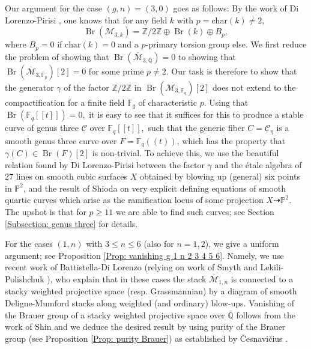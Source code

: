 \documentclass{amsart}
\theoremstyle{definition}
\theoremstyle{remark}
\DeclareMathOperator{\Br}{Br}
\newcommand{\Q}{\mathbb{Q}}
\newcommand{\ZZ}{\mathbb Z}
\begin{document}
Our argument for the case $(g, n)=(3, 0)$ goes as follows:
By the work of Di Lorenzo-Pirisi \cite{Lorenzo-Pirisi}, one knows that for any field $k$ with $p=\text{char}(k)\neq 2,$
$$
\Br(\mathcal{M}_{3, k})=\ZZ/2\ZZ \oplus \Br(k) \oplus B_{p},
$$
where $B_{p}=0$ if $\text{char}(k)=0$ and a $p$-primary torsion group else.
We first reduce the problem of showing that $\Br(\overline{\mathcal{M}}_{3, \overline{\Q}})=0$ to showing that $\Br(\overline{\mathcal{M}}_{3, \overline{\mathbb{F}}_{p}})[2]=0$ for some prime $p\neq 2.$
Our task is therefore to show that the generator $\gamma$ of the factor $\ZZ/2\ZZ$ in $\Br(\mathcal{M}_{3,\mathbb{F}_{q}})[2]$ does not extend to the compactification for a finite field $\mathbb{F}_{q}$ of characteristic $p$.
Using that $\Br(\mathbb{F}_{q}[[t]])=0,$ it is easy to see that it suffices for this to produce a stable curve of genus three $\mathscr{C}$ over $\mathbb{F}_{q}[[t]],$ such that the generic fiber $C=\mathscr{C}_{\eta}$ is a smooth genus three curve over $F=\mathbb{F}_{q}((t))$, which has the property that $\gamma(C) \in \Br(F)[2]$ is non-trivial.
To achieve this, we use the beautiful relation found by Di Lorenzo-Pirisi between the factor $\gamma$ and the étale algebra of 27 lines on smooth cubic surfaces $X$ obtained by blowing up (general) six points in $\mathbb{P}^{2}$, and the result of Shioda \cite{Shioda} on very explicit defining equations of smooth quartic curves which arise as the ramification locus of some projection $X \dashrightarrow \mathbb{P}^{2}$.
The upshot is that for $p\geq 11$ we are able to find such curves; see Section \ref{Subsection: genus three} for details.



For the cases $(1,n)$ with $3\leq n \leq 6$
(also for $n=1, 2$), we give a uniform argument; see Proposition \ref{Prop: vanishing g 1 n 2 3 4 5 6}.
Namely, we use recent work of Battistella-Di Lorenzo \cite{battistella2024wallcrossingintegralchowrings} (relying on work of Smyth \cite{Smyth19DiagramG1} and Lekili-Polishchuk \cite{LP19ModularCompactification}), who explain that in these cases the stack $\overline{\mathcal{M}}_{1,n}$ is connected to a stacky weighted projective space (resp. Grassmannian) by a diagram of smooth Deligne-Mumford stacks along weighted (and ordinary) blow-ups. 
Vanishing of the Brauer group of a stacky weighted projective space over $\overline{\mathbb{Q}}$ follows from the work of Shin \cite{ShinBrauerWeighted} and we deduce the desired result by using purity of the Brauer group (see Proposition \ref{Prop: purity Brauer}) as established by \v{C}esnavi\v{c}ius \cite{CesnaviciusPurityBrauer}.
\end{document}
